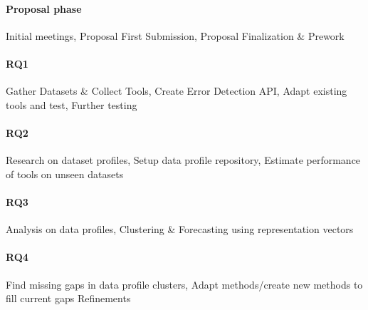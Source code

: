\paragraph{Proposal phase} Initial meetings, Proposal First Submission, Proposal Finalization \& Prework
\paragraph{RQ1} Gather Datasets \& Collect Tools, Create Error Detection API, Adapt existing tools and test, Further testing
\paragraph{RQ2} Research on dataset profiles, Setup data profile repository, Estimate performance of tools on unseen datasets
\paragraph{RQ3} Analysis on data profiles, Clustering \& Forecasting using representation vectors
\paragraph{RQ4} Find missing gaps in data profile clusters, Adapt methods/create new methods to fill current gaps
Refinements

~\\

% 
